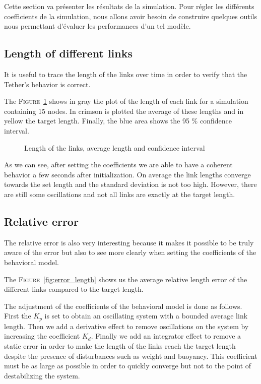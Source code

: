 Cette section va présenter les résultats de la simulation. Pour régler les différents coefficients de la simulation, nous allons avoir besoin de construire quelques outils nous permettant d'évaluer les performances d'un tel modèle.

\subsection{Length of different links}

It is useful to trace the length of the links over time in order to verify that the Tether's behavior is correct.

The \textsc{Figure}~\ref{fig:length} shows in gray the plot of the length of each link for a simulation containing 15 nodes. In crimson is plotted the average of these lengths and in yellow the target length. Finally, the blue area shows the 95 \% confidence interval.

\begin{figure}
    \centering
    
    \caption{Length of the links, average length and confidence interval}
    \label{fig:length}
\end{figure}

As we can see, after setting the coefficients we are able to have a coherent behavior a few seconds after initialization. On average the link lengths converge towards the set length and the standard deviation is not too high. However, there are still some oscillations and not all links are exactly at the target length.

\subsection{Relative error}
The relative error is also very interesting because it makes it possible to be truly aware of the error but also to see more clearly when setting the coefficients of the behavioral model.

The \textsc{Figure}~\ref{fig:error_length} shows us the average relative length error of the different links compared to the target length.

The adjustment of the coefficients of the behavioral model is done as follows. First the $K_p$ is set to obtain an oscillating system with a bounded average link length. Then we add a derivative effect to remove oscillations on the system by increasing the coefficient $K_d$. Finally we add an integrator effect to remove a static error in order to make the length of the links reach the target length despite the presence of disturbances such as weight and buoyancy. This coefficient must be as large as possible in order to quickly converge but not to the point of destabilizing the system.


